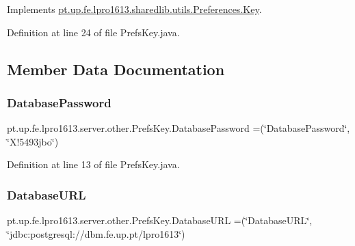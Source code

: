 Implements \hyperlink{interfacept_1_1up_1_1fe_1_1lpro1613_1_1sharedlib_1_1utils_1_1_preferences_1_1_key_af244cecb8edad1f87eaaa517c3590507}{pt.\+up.\+fe.\+lpro1613.\+sharedlib.\+utils.\+Preferences.\+Key}.



Definition at line 24 of file Prefs\+Key.\+java.



\subsection{Member Data Documentation}
\hypertarget{enumpt_1_1up_1_1fe_1_1lpro1613_1_1server_1_1other_1_1_prefs_key_a47cf4dbfe663d670dceb3ca51b4e4f79}{}\label{enumpt_1_1up_1_1fe_1_1lpro1613_1_1server_1_1other_1_1_prefs_key_a47cf4dbfe663d670dceb3ca51b4e4f79} 
\subsubsection{\texorpdfstring{Database\+Password}{DatabasePassword}}
{\footnotesize\ttfamily pt.\+up.\+fe.\+lpro1613.\+server.\+other.\+Prefs\+Key.\+Database\+Password =(\char`\"{}Database\+Password\char`\"{}, \char`\"{}X!5493jbo\char`\"{})}



Definition at line 13 of file Prefs\+Key.\+java.

\hypertarget{enumpt_1_1up_1_1fe_1_1lpro1613_1_1server_1_1other_1_1_prefs_key_a2805e6e6a98551242a1f0d86fc55a156}{}\label{enumpt_1_1up_1_1fe_1_1lpro1613_1_1server_1_1other_1_1_prefs_key_a2805e6e6a98551242a1f0d86fc55a156} 
\subsubsection{\texorpdfstring{Database\+U\+RL}{DatabaseURL}}
{\footnotesize\ttfamily pt.\+up.\+fe.\+lpro1613.\+server.\+other.\+Prefs\+Key.\+Database\+U\+RL =(\char`\"{}Database\+U\+RL\char`\"{}, \char`\"{}jdbc\+:postgresql\+://dbm.\+fe.\+up.\+pt/lpro1613\char`\"{})}




